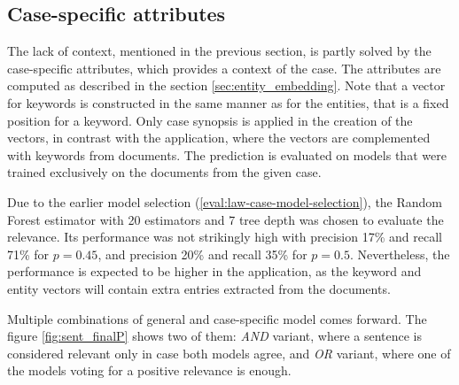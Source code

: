 \documentclass[
  digital, %
  notable,   %
  nolof,     %
  nolot,     %
]{fithesis3}
\begin{document}
\subsection{Case-specific attributes}
The lack of context, mentioned in the previous section, is partly solved by the case-specific attributes, which provides a context of the case.
The attributes are computed as described in the section \ref{sec:entity_embedding}.
Note that a vector for keywords is constructed in the same manner as for the entities, that is a fixed position for a keyword.
Only case synopsis is applied in the creation of the vectors, in contrast with the application, where the vectors are complemented with keywords from documents.
The prediction is evaluated on models that were trained exclusively on the documents from the given case.

Due to the earlier model selection (\ref{eval:law-case-model-selection}), the Random Forest estimator with 20 estimators and 7 tree depth was chosen to evaluate the relevance.
Its performance was not strikingly high with precision 17\% and recall 71\% for $p=0.45$, and precision 20\% and recall 35\% for $p=0.5$.
Nevertheless, the performance is expected to be higher in the application, as the keyword and entity vectors will contain extra entries extracted from the documents.

Multiple combinations of general and case-specific model comes forward.
The figure \ref{fig:sent_finalP} shows two of them: \textit{AND} variant, where a sentence is considered relevant only in case both models agree, and \textit{OR} variant, where one of the models voting for a positive relevance is enough.
\end{document}
